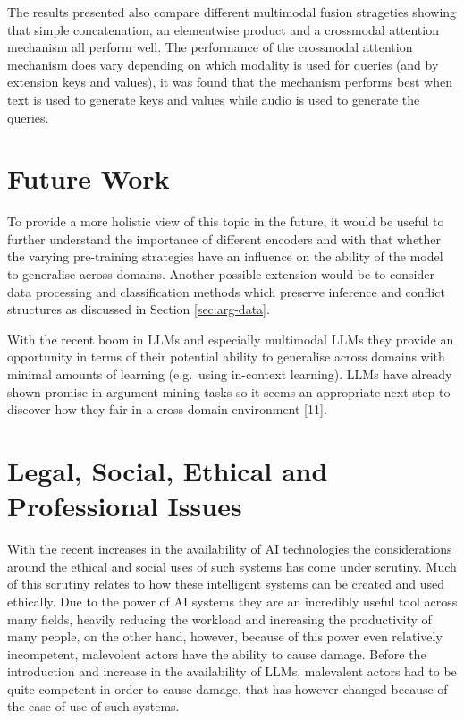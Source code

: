 \documentclass[twocolumn]{article}
\begin{document}
The results presented also compare different multimodal fusion
strageties showing that simple concatenation, an elementwise product and
a crossmodal attention mechanism all perform well. The performance of
the crossmodal attention mechanism does vary depending on which modality
is used for queries (and by extension keys and values), it was found
that the mechanism performs best when text is used to generate keys and
values while audio is used to generate the queries.

\section{Future Work}\label{future-work}

To provide a more holistic view of this topic in the future, it would be
useful to further understand the importance of different encoders and
with that whether the varying pre-training strategies have an influence
on the ability of the model to generalise across domains. Another
possible extension would be to consider data processing and
classification methods which preserve inference and conflict structures
as discussed in Section \ref{sec:arg-data}.

With the recent boom in LLMs and especially multimodal LLMs they provide
an opportunity in terms of their potential ability to generalise across
domains with minimal amounts of learning (e.g.~using in-context
learning). LLMs have already shown promise in argument mining tasks so
it seems an appropriate next step to discover how they fair in a
cross-domain environment {[}11{]}.

\section{Legal, Social, Ethical and Professional
Issues}\label{legal-social-ethical-and-professional-issues}

With the recent increases in the availability of AI technologies the
considerations around the ethical and social uses of such systems has
come under scrutiny. Much of this scrutiny relates to how these
intelligent systems can be created and used ethically. Due to the power
of AI systems they are an incredibly useful tool across many fields,
heavily reducing the workload and increasing the productivity of many
people, on the other hand, however, because of this power even
relatively incompetent, malevolent actors have the ability to cause
damage. Before the introduction and increase in the availability of
LLMs, malevalent actors had to be quite competent in order to cause
damage, that has however changed because of the ease of use of such
systems.
\end{document}
